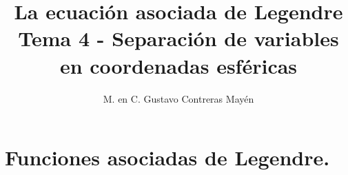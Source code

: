 

\title{La ecuación asociada de Legendre \\ {\large Tema 4 - Separación de variables en coordenadas esféricas}\vspace{-1ex}}
\author{M. en C. Gustavo Contreras Mayén}
\date{ }

\pagestyle{fancy}
\fancyhf{}
\lhead{\leftmark}
\rfoot{\thepage}
\setlength{\headheight}{16pt}%

\def\changemargin#1#2{\list{}{\rightmargin#2\leftmargin#1}\item[]}
\let\endchangemargin=\endlist 



\maketitle
\fontsize{14}{14}\selectfont
\tableofcontents
\newpage


\section{Funciones asociadas de Legendre.}


